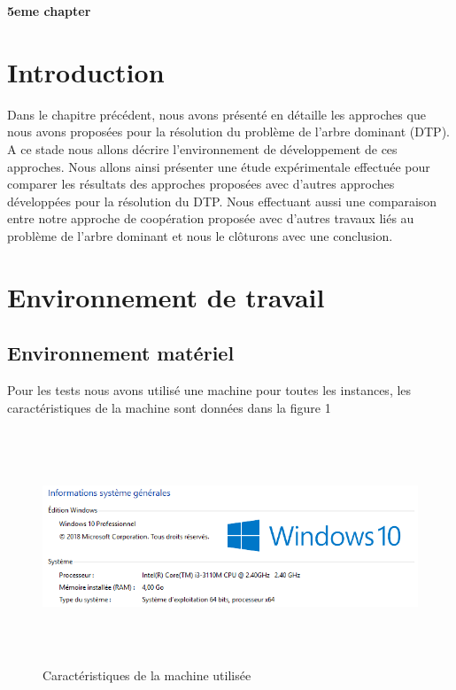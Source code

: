


\cleardoublepage


\setcounter{chapter}{5}
\setcounter{section}{0}
\setcounter{figure}{0}

\begin{center}
	\Huge\textbf{5eme chapter}
\end{center}

\section{Introduction}
Dans le chapitre précédent, nous avons présenté en détaille les approches que nous avons proposées pour la résolution du problème de l’arbre dominant (DTP). A ce stade nous allons décrire l’environnement de développement de ces approches. Nous allons ainsi présenter une étude expérimentale effectuée pour comparer les résultats des approches proposées avec d’autres approches développées pour la résolution du DTP. Nous effectuant aussi une comparaison entre notre approche de coopération proposée  avec d’autres travaux liés au problème de l’arbre dominant et nous le clôturons avec une conclusion.


\section{Environnement de travail}

\subsection{Environnement matériel}
Pour les tests nous avons utilisé une machine pour toutes les instances, les caractéristiques de la machine sont données dans la figure 1

\begin{figure}[H]
	\centering
	\includegraphics[width=16cm,height=7cm]{Chap5/1.png}
	\caption{Caractéristiques de la machine utilisée}
	\label{fig:CMU}
\end{figure}

